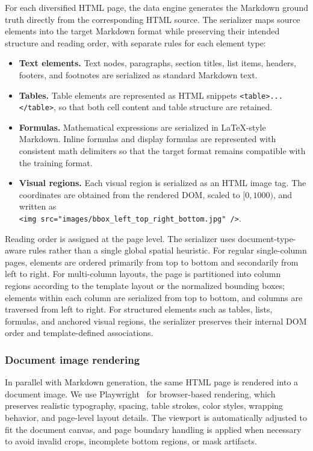 For each diversified HTML page, the data engine generates the Markdown ground truth directly from the corresponding HTML source. The serializer maps source elements into the target Markdown format while preserving their intended structure and reading order, with separate rules for each element type:
\begin{itemize}
    \item \textbf{Text elements.}
    Text nodes, paragraphs, section titles, list items, headers, footers, and footnotes are serialized as standard Markdown text.

    \item \textbf{Tables.}
    Table elements are represented as HTML snippets \texttt{<table>...</table>}, so that both cell content and table structure are retained.

    \item \textbf{Formulas.}
    Mathematical expressions are serialized in LaTeX-style Markdown. Inline formulas and display formulas are represented with consistent math delimiters so that the target format remains compatible with the training format.

    \item \textbf{Visual regions.}
    Each visual region is serialized as an HTML image tag. The coordinates are obtained from the rendered DOM, scaled to $[0,1000)$, and written as \\ \texttt{<img src="images/bbox\_left\_top\_right\_bottom.jpg" />}.
\end{itemize}

Reading order is assigned at the page level. The serializer uses document-type-aware rules rather than a single global spatial heuristic. For regular single-column pages, elements are ordered primarily from top to bottom and secondarily from left to right. For multi-column layouts, the page is partitioned into column regions according to the template layout or the normalized bounding boxes; elements within each column are serialized from top to bottom, and columns are traversed from left to right. For structured elements such as tables, lists, formulas, and anchored visual regions, the serializer preserves their internal DOM order and template-defined associations.

\subsubsection{Document image rendering}

In parallel with Markdown generation, the same HTML page is rendered into a document image. We use Playwright~\cite{playwright} for browser-based rendering, which preserves realistic typography, spacing, table strokes, color styles, wrapping behavior, and page-level layout details. The viewport is automatically adjusted to fit the document canvas, and page boundary handling is applied when necessary to avoid invalid crops, incomplete bottom regions, or mask artifacts.

